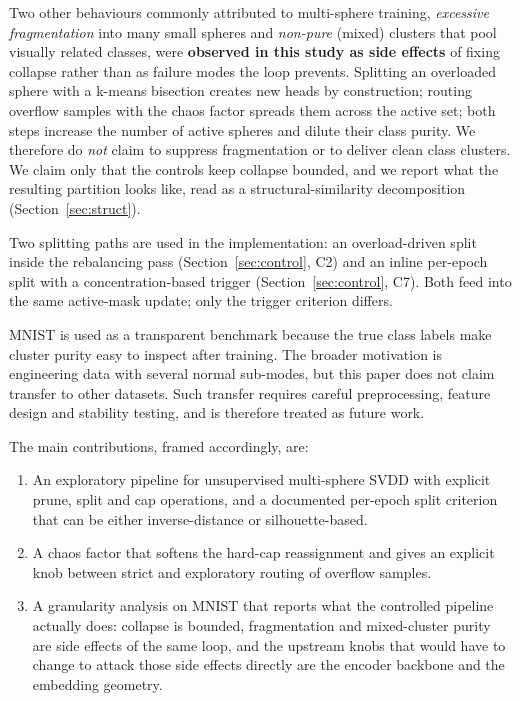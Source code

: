 \documentclass[conference]{IEEEtran}
\begin{document}
Two other behaviours commonly attributed to multi-sphere training, \emph{excessive fragmentation} into many small spheres and \emph{non-pure} (mixed) clusters that pool visually related classes, were \textbf{observed in this study as side effects} of fixing collapse rather than as failure modes the loop prevents. Splitting an overloaded sphere with a k-means bisection creates new heads by construction; routing overflow samples with the chaos factor spreads them across the active set; both steps increase the number of active spheres and dilute their class purity. We therefore do \emph{not} claim to suppress fragmentation or to deliver clean class clusters. We claim only that the controls keep collapse bounded, and we report what the resulting partition looks like, read as a structural-similarity decomposition (Section~\ref{sec:struct}).

Two splitting paths are used in the implementation: an overload-driven split inside the rebalancing pass (Section~\ref{sec:control}, C2) and an inline per-epoch split with a concentration-based trigger (Section~\ref{sec:control}, C7). Both feed into the same active-mask update; only the trigger criterion differs.

MNIST \cite{lecun1998gradient} is used as a transparent benchmark because the true class labels make cluster purity easy to inspect after training. The broader motivation is engineering data with several normal sub-modes, but this paper does not claim transfer to other datasets. Such transfer requires careful preprocessing, feature design and stability testing, and is therefore treated as future work.

The main contributions, framed accordingly, are:
\begin{enumerate}
    \item An exploratory pipeline for unsupervised multi-sphere SVDD with explicit prune, split and cap operations, and a documented per-epoch split criterion that can be either inverse-distance or silhouette-based.
    \item A chaos factor that softens the hard-cap reassignment and gives an explicit knob between strict and exploratory routing of overflow samples.
    \item A granularity analysis on MNIST that reports what the controlled pipeline actually does: collapse is bounded, fragmentation and mixed-cluster purity are side effects of the same loop, and the upstream knobs that would have to change to attack those side effects directly are the encoder backbone and the embedding geometry.
\end{enumerate}
\end{document}

